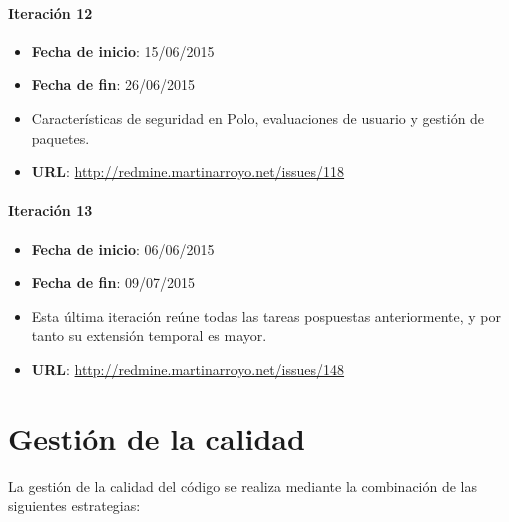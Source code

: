 \paragraph{Iteración 12\\}
\begin{itemize}
\item \textbf{Fecha de inicio}: 15/06/2015
\item \textbf{Fecha de fin}: 26/06/2015
\item Características de seguridad en Polo, evaluaciones de usuario y gestión de paquetes.
\item \textbf{URL}: \href{http://redmine.martinarroyo.net/issues/118}{http://redmine.martinarroyo.net/issues/118}
\end{itemize}

\paragraph{Iteración 13\\}
\begin{itemize}
\item \textbf{Fecha de inicio}: 06/06/2015
\item \textbf{Fecha de fin}: 09/07/2015
\item Esta última iteración reúne todas las tareas pospuestas anteriormente, y por tanto su extensión temporal es mayor. 
\item \textbf{URL}: \href{http://redmine.martinarroyo.net/issues/148}{http://redmine.martinarroyo.net/issues/148}
\end{itemize}





\section{Gestión de la calidad}

La gestión de la calidad del código se realiza mediante la combinación de las siguientes estrategias:

